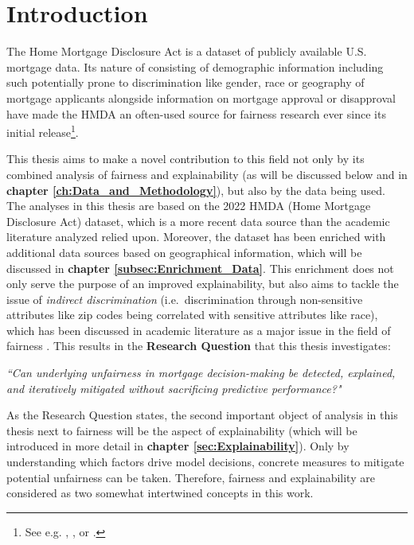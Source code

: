 \chapter{Introduction}\label{ch:Introduction}

The Home Mortgage Disclosure Act \parencite{HMDA2022} is a dataset of publicly available U.S. mortgage data. Its nature of consisting of demographic information including such potentially prone to discrimination like gender, race or geography of mortgage applicants alongside information on mortgage approval or disapproval have made the HMDA an often-used source for fairness research ever since its initial release\footnote{See e.g. \cite{So2022}, \cite{Lee2021}, or \cite{Singh2022}.}.


This thesis aims to make a novel contribution to this field not only by its combined analysis of fairness and explainability (as will be discussed below and in \textbf{chapter \ref{ch:Data_and_Methodology}}),
but also by the data being used. The analyses in this thesis are based on the 2022 HMDA (Home Mortgage Disclosure Act) dataset, which is a more recent data source than the academic literature analyzed relied upon.
Moreover, the dataset has been enriched with additional data sources based on geographical information, which will be discussed in \textbf{chapter \ref{subsec:Enrichment_Data}}.
This enrichment does not only serve the purpose of an improved explainability, but also aims to tackle the issue of \textit{indirect discrimination} (i.e.\ discrimination through non-sensitive attributes like zip codes being correlated with sensitive attributes like race), 
which has been discussed in academic literature as a major issue in the field of fairness \parencite{Mehrabi2021}. This results in the \textbf{Research Question} that this thesis investigates:

\textit{“Can underlying unfairness in mortgage decision-making be detected, explained, and iteratively mitigated without sacrificing predictive performance?"} %

As the Research Question states, the second important object of analysis in this thesis next to fairness will be the aspect of explainability (which will be introduced in more detail in \textbf{chapter \ref{sec:Explainability}}). Only by understanding which factors drive model decisions, concrete measures to mitigate potential unfairness can be taken. Therefore, fairness and explainability are considered as two somewhat intertwined concepts in this work.